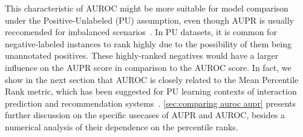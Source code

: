 
%
%
%
%


This characteristic of AUROC might be more suitable for model comparison under the Positive-Unlabeled (PU) assumption, even though AUPR is usually reccomended for imbalanced scenarios~\cite{he2009learning,saito2015precisionrecall,fernandez2018learning}.
In PU datasets, it is common for negative-labeled instances to rank highly due to the possibility of them being unannotated positives. These highly-ranked negatives would have a larger influence on the AUPR score in comparison to the AUROC score.
In fact, we show in the next section that AUROC is closely related to the Mean Percentile Rank metric, which has been suggested for PU learning contexts of interaction prediction and recommendation systems~\cite{pahikkala2015more,johnsonlogistic,hao2019opensource,yu2020fpscdtia}. \autoref{sec:comparing auroc aupr} presents further discussion on the specific usecases of AUPR and AUROC, besides a numerical analysis of their dependence on the percentile ranks.


